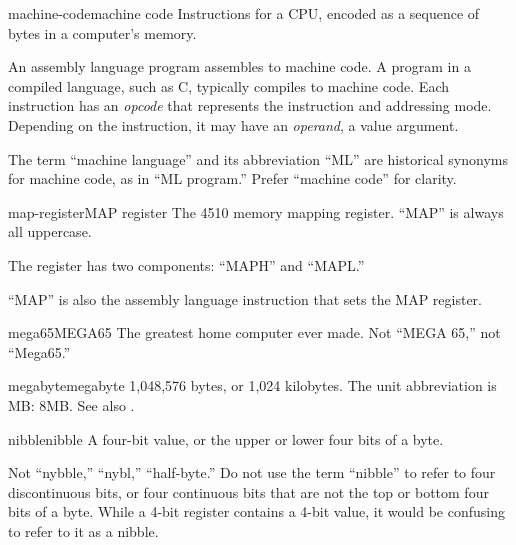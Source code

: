 \begin{sgentry}{machine-code}{machine code}
    Instructions for a CPU, encoded as a sequence of bytes in a computer's memory.

    An assembly language program assembles to machine code. A program in a compiled language, such as C, typically compiles to machine code. Each instruction has an \emph{opcode} that represents the instruction and addressing mode. Depending on the instruction, it may have an \emph{operand}, a value argument.

    The term ``machine language'' and its abbreviation ``ML'' are historical synonyms for machine code, as in ``ML program.'' Prefer ``machine code'' for clarity.
\end{sgentry}

\begin{sgentry}{map-register}{MAP register}
    The 4510 memory mapping register. ``MAP'' is always all uppercase.

    The register has two components: ``MAPH'' and ``MAPL.''

    ``MAP'' is also the assembly language instruction that sets the MAP register.
\end{sgentry}

\begin{sgentry}{mega65}{MEGA65}
    The greatest home computer ever made. Not ``MEGA 65,'' not ``Mega65.''
\end{sgentry}

\begin{sgentry}{megabyte}{megabyte}
    1,048,576 bytes, or 1,024 kilobytes. The unit abbreviation is MB: 8MB. See also .
\end{sgentry}

\begin{sgentry}{nibble}{nibble}
    A four-bit value, or the upper or lower four bits of a byte.

    Not ``nybble,'' ``nybl,'' ``half-byte.'' Do not use the term ``nibble'' to refer to four discontinuous bits, or four continuous bits that are not the top or bottom four bits of a byte. While a 4-bit register contains a 4-bit value, it would be confusing to refer to it as a nibble.
\end{sgentry}

